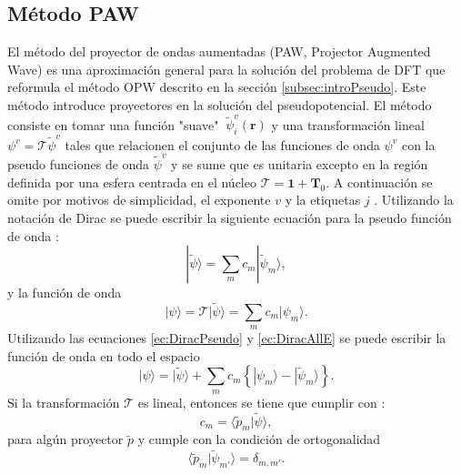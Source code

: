    \subsection{M\'etodo PAW}\label{subsec:PAW}
   El m\'etodo del proyector de ondas aumentadas (PAW, Projector Augmented Wave) \cite{PhysRevB.59.1758, PhysRevB.50.17953} es una aproximaci\'on general para la soluci\'on del problema de DFT que reformula el m\'etodo OPW descrito en la secci\'on \ref{subsec:introPseudo}. Este m\'etodo introduce proyectores en la soluci\'on del pseudopotencial.  El m\'etodo consiste en tomar una funci\'on "suave" $~\tilde{\psi}_i^v (\pmb{r})$ y una transformaci\'on lineal  $\psi^v = \mathcal{T} \tilde{\psi}^v  $ tales que relacionen el conjunto de las funciones de onda $\psi^v $ con la pseudo funciones de onda $ \tilde{\psi}^v$ y se sume que es unitaria excepto en la regi\'on definida por una esfera centrada en el n\'ucleo $\mathcal{T} = \pmb{1}+ \pmb{T}_0$. A continuaci\'on  se omite por motivos de simplicidad, el exponente $v$ y la etiquetas $j$ \cite{PhysRevB.59.1758}.  Utilizando la notaci\'on de Dirac se puede escribir la siguiente ecuaci\'on para la pseudo funci\'on de onda \cite{PhysRevB.59.1758, Martin-2004}:
   \begin{equation}
   | \tilde{\psi} \rangle = \sum_m c_m | \tilde{\psi}_m \rangle \label{ec:DiracPseudo},
   \end{equation}
   y la funci\'on de onda
   \begin{equation}
   |\psi \rangle = \mathcal{T} |\tilde{\psi} \rangle = \sum_m c_m | \psi_m \rangle. \label{ec:DiracAllE}
   \end{equation}
   Utilizando las ecuaciones \ref{ec:DiracPseudo} y \ref{ec:DiracAllE} se puede escribir  la funci\'on de onda en todo el espacio  \cite{PhysRevB.59.1758}
   \begin{equation}
   | \psi \rangle = |\tilde{\psi} \rangle + \sum_m c_m \left\{|\psi_m \rangle - |\tilde{\psi}_m \rangle \right\}. \label{ec:DiracFunc}
   \end{equation}
   Si la transformaci\'on $\mathcal{T}$ es lineal, entonces se tiene que cumplir con \cite{doi:10.1063/1.2338035}:
   \begin{equation}
   	c_m = \langle \tilde{p}_m | \tilde{\psi} \rangle,  \label{ec:condProj}
   \end{equation}
   para alg\'un proyector $\tilde{p}$ y cumple con la condici\'on de ortogonalidad
   \begin{equation}
   \langle \tilde{p}_m | \tilde{\psi}_{m'} \rangle = \delta_{m,m'}. \label{ec:orotoDirac}
   \end{equation}
